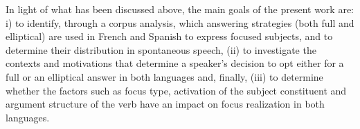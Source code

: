 In light of what has been discussed above, the main goals of the present work are: i) to identify, through a corpus analysis, which answering strategies (both full and elliptical) are used in French and Spanish to express focused subjects, and to determine their distribution in spontaneous speech, (ii) to investigate the contexts and motivations that determine a speaker's decision to opt either for a full or an elliptical answer in both languages and, finally, (iii) to determine whether the factors such as focus type, activation of the subject constituent and argument structure of the verb have an impact on focus realization in both languages.
